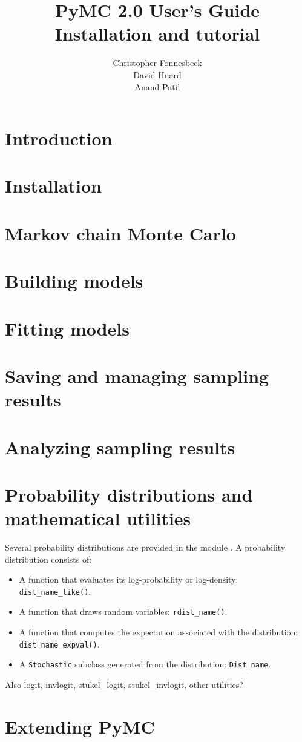 \documentclass[]{manual}
\title{PyMC 2.0 User's Guide \\
Installation and tutorial}
\author{ Christopher Fonnesbeck\\ David Huard \\ Anand Patil }
\begin{document}
\maketitle

\tableofcontents

\chapter{Introduction} 
\label{chap:intro} 


\chapter{Installation} 
\label{chap:install} 


\chapter{Markov chain Monte Carlo} 
\label{chap:MCMC} 


\chapter{Building models}
\label{chap:modelbuilding} 


\chapter{Fitting models}
\label{chap:modelfitting}


\chapter{Saving and managing sampling results}
\label{chap:database} 


\chapter{Analyzing sampling results} 
\label{chap:analyzing}


\chapter{Probability distributions and mathematical utilities} 
\label{chap:distributions}
Several probability distributions are provided in the module . A probability distribution consists of:
\begin{itemize}
    \item A function that evaluates its log-probability or log-density: \texttt{dist_name_like()}.
    \item A function that draws random variables: \texttt{rdist_name()}.
    \item A function that computes the expectation associated with the distribution: \texttt{dist_name_expval()}.
    \item A \texttt{Stochastic} subclass generated from the distribution: \texttt{Dist_name}.
\end{itemize} 
Also logit, invlogit, stukel\_logit, stukel\_invlogit, other utilities?

\chapter{Extending PyMC}
\label{chap:extending}






\end{document}
